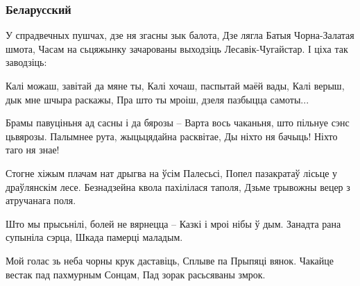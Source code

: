  
 

\subsubsection{Беларусский}

У спрадвечных пушчах, дзе ня згасны зык балота,
Дзе лягла Батыя Чорна-Залатая шмота,
Часам на сьцяжынку зачарованы выходзіць
Лесавік-Чугайстар. І ціха так заводзіць:

Калі можаш, завітай да мяне ты,
Калі хочаш, паспытай маёй вады,
Калі верыш, дык мне шчыра раскажы,
Пра што ты мроіш, дзеля пазбыцца самоты...

Брамы павуціньня ад сасны і да бярозы –
Варта вось чаканьня, што пільнуе сэнс цьвярозы.
Палымнее рута, жыцьцядайна расквітае,
Ды ніхто ня бачыць! Ніхто таго ня знае!

Стогне хіжым плачам нат дрыгва на ўсім Палесьсі,
Попел пазакратаў лісьце у драўлянскім лесе.
Безнадзейна квола пахілілася таполя,
Дзьме трывожны вецер з атручанага поля.

Што мы прысьнілі, болей не вярнецца –
Казкі і мроі нібы ў дым.
Занадта рана супыніла сэрца,
Шкада памерці маладым.

Мой голас зь неба чорны крук даставіць,
Сплыве па Прыпяці вянок.
Чакайце вестак пад пахмурным Сонцам,
Пад зорак расьсяваны змрок.
